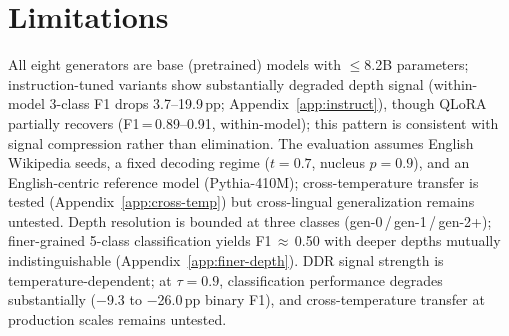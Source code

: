 \section*{Limitations}
\label{sec:limitations}

 All eight generators are base (pretrained) models with $\leq$8.2B parameters; instruction-tuned variants show substantially degraded depth signal (within-model 3-class F1 drops 3.7--19.9\,pp; Appendix~\ref{app:instruct}), though QLoRA partially recovers (F1\,=\,0.89--0.91, within-model); this pattern is consistent with signal compression rather than elimination.
The evaluation assumes English Wikipedia seeds, a fixed decoding regime ($t{=}0.7$, nucleus $p{=}0.9$), and an English-centric reference model (Pythia-410M); cross-temperature transfer is tested (Appendix~\ref{app:cross-temp}) but cross-lingual generalization remains untested.
Depth resolution is bounded at three classes (gen-0\,/\,gen-1\,/\,gen-2+); finer-grained 5-class classification yields F1\,$\approx$\,0.50 with deeper depths mutually indistinguishable (Appendix~\ref{app:finer-depth}).
DDR signal strength is temperature-dependent; at $\tau{=}0.9$, classification performance degrades substantially ($-$9.3 to $-$26.0\,pp binary F1), and cross-temperature transfer at production scales remains untested.
